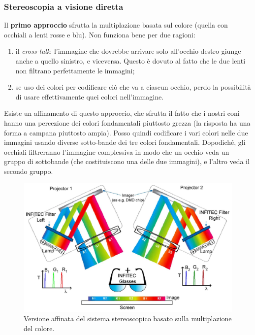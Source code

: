 \documentclass[a4paper,11pt]{article}
\begin{document}
\subsubsection{Stereoscopia a visione diretta}
Il \textbf{primo approccio} sfrutta la multiplazione basata sul colore (quella con occhiali a lenti rosse e blu). Non funziona bene per due ragioni:
\begin{enumerate}
    \item il \textit{cross-talk}: l'immagine che dovrebbe arrivare solo all'occhio destro giunge anche a quello sinistro, e viceversa. Questo è dovuto al fatto
    che le due lenti non filtrano perfettamente le immagini;
    \item se uso dei colori per codificare ciò che va a ciascun occhio, perdo la possibilità di usare effettivamente quei colori nell'immagine.
\end{enumerate}
\par
Esiste un affinamento di questo approccio, che sfrutta il fatto che i nostri coni hanno una percezione dei colori fondamentali piuttosto grezza (la
risposta ha una forma a campana piuttosto ampia). Posso quindi codificare i vari colori nelle due immagini usando diverse sotto-bande dei tre colori fondamentali. Dopodiché,
gli occhiali filtreranno l'immagine complessiva in modo che un occhio veda un gruppo di sottobande (che costituiscono una delle due immagini), e l'altro veda il secondo gruppo.

\renewcommand{\thefigure}{4.28}
\begin{figure}[!h]
  \centering
    \includegraphics[scale=0.35]{images/4/3d_cmux.png}
    \caption{Versione affinata del sistema stereoscopico basato sulla multiplazione del colore.}
\end{figure}
\end{document}
